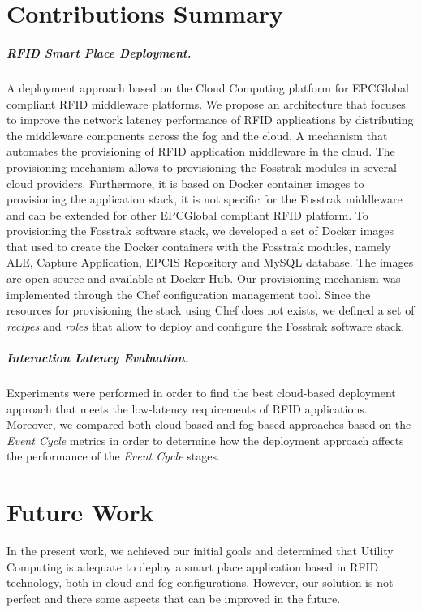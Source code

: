 \section{Contributions Summary}
\label{sec:contributions}

\subparagraph{RFID Smart Place Deployment.}
\label{subp:rfid_smart_place_architecture}
A deployment approach based on the Cloud Computing platform for EPCGlobal compliant \gls{RFID}
middleware platforms. We propose an architecture that focuses to improve the network latency
performance of \gls{RFID} applications by distributing the middleware components across the fog and
the cloud.
%
A mechanism that automates the provisioning of \gls{RFID} application middleware in the cloud.
The provisioning mechanism allows to provisioning the Fosstrak modules in several cloud
providers. Furthermore, it is based on Docker container images to provisioning the application
stack, it is not specific for the Fosstrak middleware and can be extended for other EPCGlobal
compliant \gls{RFID} platform.
%
To provisioning the Fosstrak software stack, we developed a set of Docker images that used to
create the Docker containers with the Fosstrak modules, namely \gls{ALE}, Capture Application,
\gls{EPCIS} Repository and MySQL database. The images are open-source and available at
Docker Hub.
%
Our provisioning mechanism was implemented through the Chef configuration management tool. Since the
resources for provisioning the stack using Chef does not exists, we defined a set of \textit{recipes}
and \textit{roles} that allow to deploy and configure the Fosstrak software stack.

\subparagraph{Interaction Latency Evaluation.}
\label{subp:event_latency_performance_eval}
Experiments were performed in order to find the best cloud-based deployment approach that meets the
low-latency requirements of \gls{RFID} applications. Moreover, we compared both cloud-based and fog-based
approaches based on the \textit{Event Cycle} metrics in order to determine how the deployment
approach affects the performance of the \textit{Event Cycle} stages.

\section{Future Work}
\label{sec:future_work}
In the present work, we achieved our initial goals and determined that Utility Computing is adequate
to deploy a smart place application based in \gls{RFID} technology, both in cloud and fog configurations.
However, our solution is not perfect and there some aspects that can be improved in the future.

